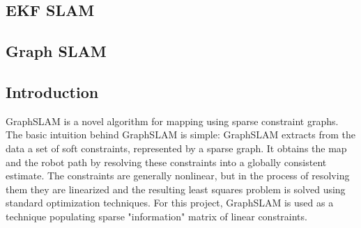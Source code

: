 \documentclass{ba-kecs}
\numberwithin{figure}{section}
\begin{document}
\subsection{EKF SLAM}

\subsection{Graph SLAM}

\subsection{Introduction}
	GraphSLAM is a novel algorithm for mapping using sparse constraint graphs. The basic intuition behind GraphSLAM is simple: GraphSLAM extracts from the data a set of soft constraints, represented by a sparse graph. It obtains the map and the robot path by resolving these constraints into a globally consistent estimate. The constraints are generally nonlinear, but in the process of resolving them they are linearized and the resulting least squares problem is solved using standard optimization techniques\cite{sik}. For this project, GraphSLAM is used as a technique populating sparse "information" matrix of linear constraints.
\end{document}
